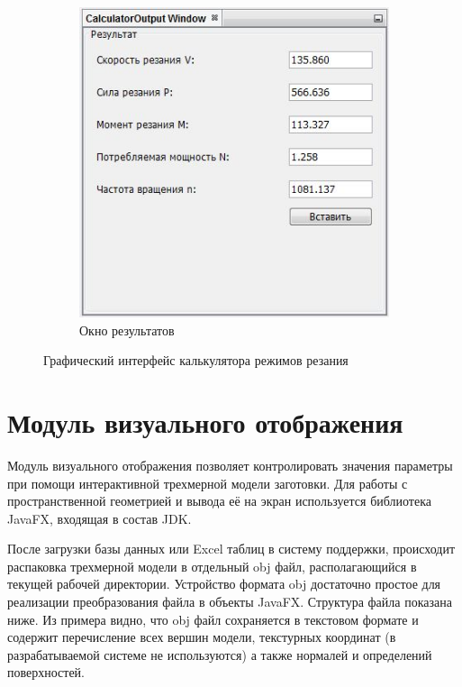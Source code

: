 \documentclass[14pt,oneside,final]{extreport}
\begin{document}
\begin{figure}[h!]
\begin{subfigure}[t]{0.5\textwidth}
			\includegraphics[width=1\textwidth]{img/calc-output-screen} 
			\caption{Окно результатов} \label{fig:calc-output-screen}
		\end{subfigure}
		\caption{Графический интерфейс калькулятора режимов резания} \label{fig:calc-screen}
	\end{figure} 	

	\section{Модуль визуального отображения}	
	Модуль визуального отображения позволяет контролировать значения параметры при помощи интерактивной трехмерной модели заготовки. Для работы с пространственной геометрией и вывода её на экран используется библиотека JavaFX, входящая в состав JDK. 
	
	После загрузки базы данных или Excel таблиц в систему поддержки, происходит распаковка трехмерной модели в отдельный obj файл, располагающийся в текущей рабочей директории. Устройство формата obj достаточно простое для реализации преобразования файла в объекты JavaFX. Структура файла показана ниже. Из примера видно, что obj файл сохраняется в текстовом формате и содержит перечисление всех вершин модели, текстурных координат (в разрабатываемой системе не используются) а также нормалей и определений поверхностей. 
	
\end{document}
